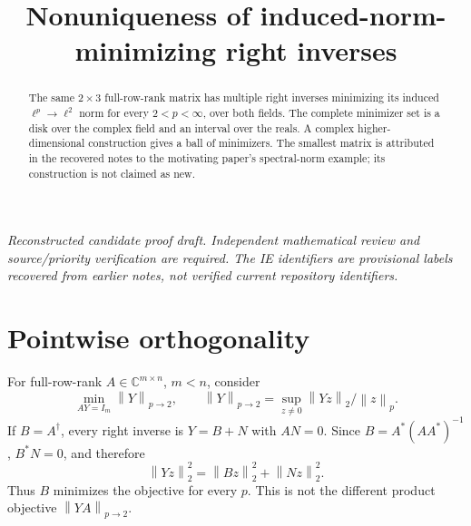 \documentclass[11pt]{article}
\title{Nonuniqueness of induced-norm-minimizing right inverses}
\author{}
\date{}
\newcommand{\C}{\mathbb C}
\newcommand{\norm}[1]{\left\lVert#1\right\rVert}
\begin{document}
\maketitle
\noindent\textit{Reconstructed candidate proof draft. Independent mathematical review and source/priority verification are required. The IE identifiers are provisional labels recovered from earlier notes, not verified current repository identifiers.}


\begin{abstract}
The same $2\times3$ full-row-rank matrix has multiple right inverses minimizing its induced $\ell^p\to\ell^2$ norm for every $2<p<\infty$, over both fields. The complete minimizer set is a disk over the complex field and an interval over the reals. A complex higher-dimensional construction gives a ball of minimizers. The smallest matrix is attributed in the recovered notes to the motivating paper's spectral-norm example; its construction is not claimed as new.
\end{abstract}
\section{Pointwise orthogonality}
For full-row-rank $A\in\C^{m\times n}$, $m<n$, consider
\[\min_{AY=I_m}\norm Y_{p\to2},\qquad \norm Y_{p\to2}=\sup_{z\ne0}\norm{Yz}_2/\norm z_p.\]
If $B=A^\dagger$, every right inverse is $Y=B+N$ with $AN=0$. Since $B=A^*(AA^*)^{-1}$, $B^*N=0$, and therefore
\[\norm{Yz}_2^2=\norm{Bz}_2^2+\norm{Nz}_2^2.\]
Thus $B$ minimizes the objective for every $p$. This is not the different product objective $\norm{YA}_{p\to2}$.
\end{document}
